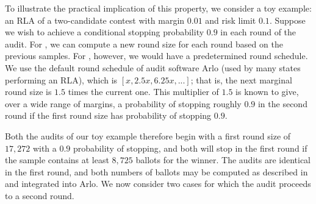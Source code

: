 



%
To illustrate the practical implication of this property, we consider a toy example: an RLA of a two-candidate contest with margin $0.01$ and risk limit $0.1$. 
Suppose we wish to achieve a conditional stopping probability $0.9$ in each round of the audit. For \Providence, we can compute a new round size for each round based on the previous samples. For \Minerva, however, we would have a predetermined round schedule. We use the default \Minerva round schedule of audit software Arlo \cite{arlo} (used by many states performing an RLA), which is $[x, 2.5x, 6.25x, ...]$; that is, the next marginal round size is $1.5$ times the current one. This multiplier of $1.5$ is known to give, over a wide range of margins, a probability of stopping roughly $0.9$ in the second round if the first round size has probability of stopping $0.9$. 

Both the audits of our toy example therefore begin with a first round size of $17,272$ with a $0.9$ probability of stopping, and both will stop in the first round if the sample contains at least $8,725$ ballots for the winner. The audits are identical in the first round, and both numbers of ballots may be computed as described in \cite{usenix_minerva} and integrated into Arlo. We now consider two cases for which the audit proceeds to a second round. 

